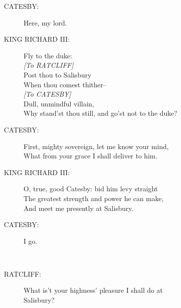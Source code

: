 \documentclass{article}
\begin{document}
\begin{description}
\item[CATESBY:] 
\hspace{1pt}Here, my lord.\\
\end{description}
\begin{description}
\item[KING RICHARD III:] 
\hspace{1pt}Fly to the duke:\\
{\it [To RATCLIFF]}\\
\hspace{1pt}Post thou to Salisbury\\
\hspace{1pt}When thou comest thither--\\
{\it [To CATESBY]}\\
\hspace{1pt}Dull, unmindful villain,\\
\hspace{1pt}Why stand'st thou still, and go'st not to the duke?\\
\end{description}
\begin{description}
\item[CATESBY:] 
\hspace{1pt}First, mighty sovereign, let me know your mind,\\
\hspace{1pt}What from your grace I shall deliver to him.\\
\end{description}
\begin{description}
\item[KING RICHARD III:] 
\hspace{1pt}O, true, good Catesby: bid him levy straight\\
\hspace{1pt}The greatest strength and power he can make,\\
\hspace{1pt}And meet me presently at Salisbury.\\
\end{description}
\begin{description}
\item[CATESBY:] 
\hspace{1pt}I go.\\
\end{description}
\centering{\it [Exit]}\\
\begin{description}
\item[RATCLIFF:] 
\hspace{1pt}What is't your highness' pleasure I shall do at\\
\hspace{1pt}Salisbury?\\
\end{description}
\end{document}
